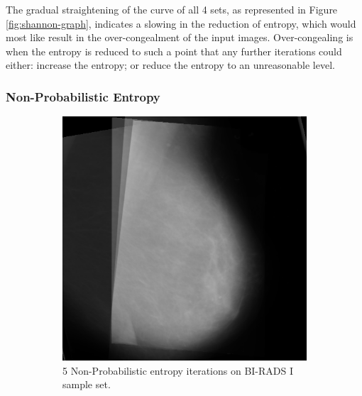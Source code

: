 The gradual straightening of the curve of all 4 sets, as represented in Figure \ref{fig:shannon-graph}, indicates a slowing in the reduction of entropy, which would most like result in the over-congealment of the input images. Over-congealing is when the entropy is reduced to such a point that any further iterations could either: increase the entropy; or reduce the entropy to an unreasonable level.

\newpage
\subsubsection{Non-Probabilistic Entropy}

\begin{figure}[H]
    \centering
    \begin{subfigure}[t]{0.3\textwidth}
        \includegraphics[width=\textwidth]{Chapter3/nonProb-img/nonProb-5.png}
        \caption{5 Non-Probabilistic entropy iterations on BI-RADS I sample set.}
        \label{fig:5-nonProb}
    \end{subfigure} \hfill
    ~ %
    \begin{subfigure}[t]{0.3\textwidth}

\end{subfigure}
\end{figure}
